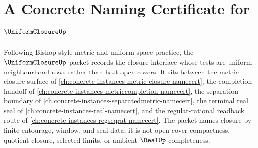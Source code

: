 \chapter{A Concrete Naming Certificate for $\UniformClosureUp$}
\label{ch:concrete-instances-uniform-closure-namecert}

Following Bishop-style metric and uniform-space practice, the $\UniformClosureUp$ packet records the closure interface whose tests are uniform-neighbourhood rows rather than host open covers. It sits between the metric closure surface of \autoref{ch:concrete-instances-metric-closure-namecert}, the completion handoff of \autoref{ch:concrete-instances-metriccompletion-namecert}, the separation boundary of \autoref{ch:concrete-instances-separatedmetric-namecert}, the terminal real seal of \autoref{ch:concrete-instances-real-namecert}, and the regular-rational readback route of \autoref{ch:concrete-instances-regseqrat-namecert}. The packet names closure by finite entourage, window, and seal data; it is not open-cover compactness, quotient closure, selected limits, or ambient $\RealUp$ completeness.

